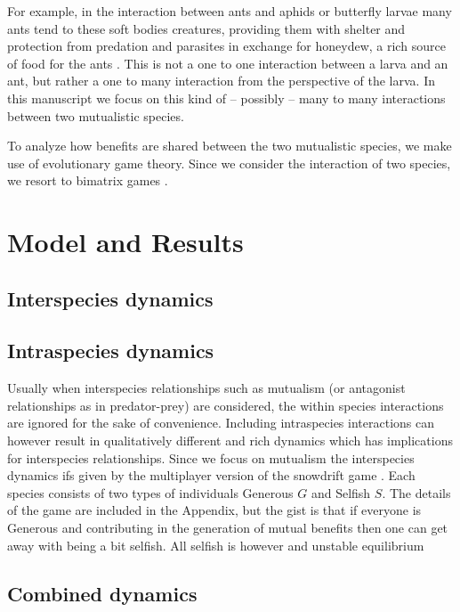 \documentclass{pnastwo}
\begin{document}
\begin{article}
For example, in the interaction between ants and aphids or butterfly larvae \cite{pierce:BES:1987,hoelldobler:book:1990} many ants tend to these soft bodies creatures, providing them with shelter and protection from predation and parasites in exchange for honeydew, a rich source of food for the ants \cite{hill:OEC:1989,stadler:book:2008}.
This is not a one to one interaction between a larva and an ant, but rather a one to many interaction from the perspective of the larva.
In this manuscript we focus on this kind of -- possibly -- many to many interactions between two mutualistic species.

To analyze how benefits are shared between the two mutualistic species, we make use of evolutionary game theory.
Since we consider the interaction of two species, we resort to bimatrix games
\cite{weibull:book:1995,hofbauer:JMB:1996,hofbauer:book:1998}.



\section{Model and Results}

\subsection{Interspecies dynamics}

\subsection{Intraspecies dynamics}

Usually when interspecies relationships such as mutualism (or antagonist relationships as in predator-prey) are considered, the within species interactions are ignored for the sake of convenience. Including intraspecies interactions can however result in qualitatively different and rich dynamics which has implications for interspecies relationships.
Since we focus on mutualism the interspecies dynamics  ifs given by the multiplayer version of the snowdrift game \cite{bergstrom:PNAS:2003,souza:JTB:2009,gokhale:PRSB:2012}.
Each species consists of two types of individuals Generous $G$ and Selfish $S$. 
The details of the game are included in the Appendix, but the gist is that if everyone is Generous and contributing in the generation of mutual benefits then one can get away with being a bit selfish. All selfish is however and unstable equilibrium 

\subsection{Combined dynamics}


\end{article}
\end{document}
